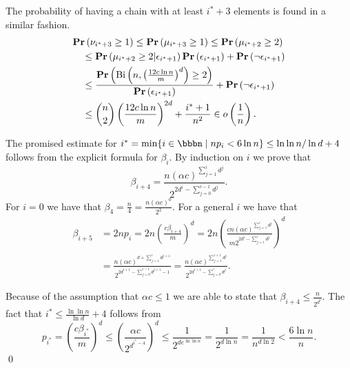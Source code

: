 The probability of having a chain with at least $i^* + 3$ elements is found in a similar fashion.
\[
\begin{split}
& \mathbf{Pr}\left(\nu_{i^* + 3} \geq 1\right)
	\leq \mathbf{Pr}\left(\mu_{i^* + 3} \geq 1\right) \leq \mathbf{Pr}\left(\mu_{i^* + 2} \geq 2\right) \\
	& \quad \leq \mathbf{Pr}\left(\mu_{i^* + 2} \geq 2 | \epsilon_{i^* + 1}\right)\mathbf{Pr}\left(\epsilon_{i^* + 1}\right) + \mathbf{Pr}\left(\neg \epsilon_{i^* + 1}\right) \\
	& \quad \leq \frac{\mathbf{Pr}\left(\mathrm{Bi}\left(n, \left(\frac{12 c \ln n}{m}\right) ^ d\right) \geq 2\right)}{\mathbf{Pr}\left(\epsilon_{i^* + 1}\right)} + \mathbf{Pr}\left(\neg \epsilon_{i^* + 1}\right) \\
	& \quad \leq \binom{n}{2} \left(\frac{12 c \ln n}{m}\right) ^ {2d} + \frac{i^* + 1}{n ^ 2} \in o\left(\frac{1}{n}\right) \textit{.}
\end{split}
\]

The promised estimate for $i^* = \displaystyle\min \{i \in \bbbn \setdelim np_i < 6 \ln n\} \leq \ln \ln n / \ln d + 4$ follows from the explicit formula for $\beta_i$. By induction on $i$ we prove that $$\beta_{i + 4} = \frac{n \left(\alpha c\right) ^ {\sum_{j = 1}^{i}d ^ j}}{2 ^ {2 d ^ i - \sum_{j = 0}^{i - 1}{d ^ j}}} \textit{.}$$ For $i = 0$ we have that $\beta_4 = \frac{n}{4} = \frac{n\left(\alpha c\right) ^ 0}{2 ^ {2}}$. For a general $i$ we have that
\[
\begin{split}
\beta_{i + 5} 
	& = 2np_i = 2n \left(\frac{c\beta_{i + 4}}{m}\right) ^ d = 2n \left(\frac{cn\left(\alpha c\right) ^ {\sum_{j = 1}^{i}d ^ j}}{m 2 ^ {2 d ^ i - \sum_{j = 1}^{i}d^j}}\right) ^ d \\
	& = \frac{n\left(\alpha c\right) ^ {d + \sum_{j = 1}^{i} d ^ {j + 1}}}{2 ^ {2d ^ {i + 1} - \sum_{j = 0}^{i  -1} d ^ {j + 1} - 1}} = \frac{n \left(\alpha c\right) ^ {\sum_{j = 1}^{i + 1} d ^ j}}{2 ^ {2d ^ {i + 1} - \sum_{j = 0}^{i} d ^ j}} \textit{.}
\end{split}
\]

Because of the assumption that $\alpha c \leq 1$ we are able to state that $\beta_{i + 4} \leq \frac{n}{2 ^ {d ^ i}}$. The fact that $i^* \leq \frac{\ln \ln n}{\ln d} + 4$ follows from
\[
p_{i^*} = \left(\frac{c\beta_{i^*}}{m}\right) ^ d \leq \left(\frac{\alpha c}{2 ^ {d ^ {i^* - 4}}}\right) ^ d \leq \frac{1}{2 ^ {de^{\ln \ln n}}} = \frac{1}{2 ^ {d \ln n}} = \frac{1}{n ^ {d \ln 2}} < \frac{6 \ln n}{n}.
\]
\qed
